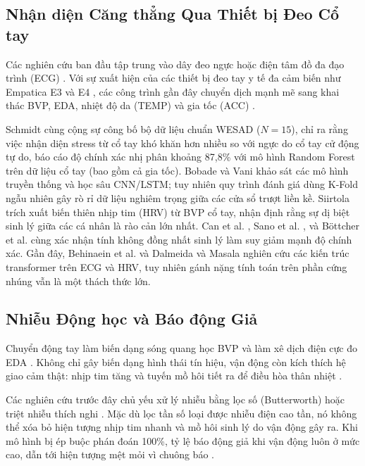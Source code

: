 \documentclass[conference]{IEEEtran}
\begin{document}
\subsection{Nhận diện Căng thẳng Qua Thiết bị Đeo Cổ tay}
Các nghiên cứu ban đầu tập trung vào dây đeo ngực hoặc điện tâm đồ đa đạo trình (ECG) \cite{taskforce1996heart}. Với sự xuất hiện của các thiết bị đeo tay y tế đa cảm biến như Empatica E3 và E4 \cite{garbarino2014empatica}, các công trình gần đây chuyển dịch mạnh mẽ sang khai thác BVP, EDA, nhiệt độ da (TEMP) và gia tốc (ACC) \cite{can2019stress, gjoreski2016continuous}.

Schmidt cùng cộng sự \cite{schmidt2018wesad} công bố bộ dữ liệu chuẩn WESAD ($N=15$), chỉ ra rằng việc nhận diện stress từ cổ tay khó khăn hơn nhiều so với ngực do cổ tay cử động tự do, báo cáo độ chính xác nhị phân khoảng 87,8\% với mô hình Random Forest trên dữ liệu cổ tay (bao gồm cả gia tốc). Bobade và Vani \cite{bobade2020stress} khảo sát các mô hình truyền thống và học sâu CNN/LSTM; tuy nhiên quy trình đánh giá dùng K-Fold ngẫu nhiên gây rò rỉ dữ liệu nghiêm trọng giữa các cửa sổ trượt liền kề. Siirtola \cite{siirtola2019continuous} trích xuất biến thiên nhịp tim (HRV) từ BVP cổ tay, nhận định rằng sự dị biệt sinh lý giữa các cá nhân là rào cản lớn nhất. Can et al. \cite{can2019stress}, Sano et al. \cite{sano2018multimodal}, và Böttcher et al. \cite{bottcher2023detection} cùng xác nhận tính không đồng nhất sinh lý làm suy giảm mạnh độ chính xác. Gần đây, Behinaein et al. \cite{behinaein2021transformer} và Dalmeida và Masala \cite{dalmeida2021hrv} nghiên cứu các kiến trúc transformer trên ECG và HRV, tuy nhiên gánh nặng tính toán trên phần cứng nhúng vẫn là một thách thức lớn.

\subsection{Nhiễu Động học và Báo động Giả}
Chuyển động tay làm biến dạng sóng quang học BVP và làm xê dịch điện cực đo EDA \cite{tamura2014wearable, zhang2014troika, schumm2008effect}. Không chỉ gây biến dạng hình thái tín hiệu, vận động còn kích thích hệ giao cảm thật: nhịp tim tăng và tuyến mồ hôi tiết ra để điều hòa thân nhiệt \cite{boucsein2012electrodermal}.

Các nghiên cứu trước đây chủ yếu xử lý nhiễu bằng lọc số (Butterworth) hoặc triệt nhiễu thích nghi \cite{zhang2014troika}. Mặc dù lọc tần số loại được nhiễu điện cao tần, nó không thể xóa bỏ hiện tượng nhịp tim nhanh và mồ hôi sinh lý do vận động gây ra. Khi mô hình bị ép buộc phán đoán 100\%, tỷ lệ báo động giả khi vận động luôn ở mức cao, dẫn tới hiện tượng mệt mỏi vì chuông báo \cite{sendelbach2013alarm}.
\end{document}
